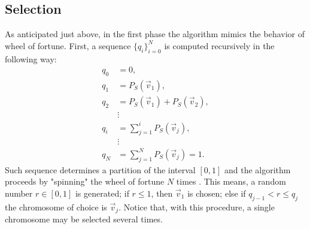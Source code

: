 \documentclass[%
    corpo=11pt,
    twoside,
    stile=classica,
    oldstyle,
    autoretitolo,
    tipotesi=magistrale,
    greek,
    evenboxes,
    english
]{toptesi}
\begin{document}
\subsection{Selection}
As anticipated just above, in the first phase the algorithm mimics the behavior of wheel of fortune. First, a sequence $\{q_i\}_{i=0}^{N}$ is computed recursively in the following way:
\begin{align}
q_0 &= 0, \nonumber \\
q_1 &= P_S(\vec{v}_1), \nonumber \\
q_2 &= P_S(\vec{v}_1) + P_S(\vec{v}_2), \nonumber \\
&\vdots \nonumber \\
q_i &= \sum_{j=1}^{i}P_S(\vec{v}_j), \nonumber \\
&\vdots \nonumber \\
q_N &= \sum_{j=1}^{N}P_S(\vec{v}_j) = 1.
\end{align}
Such sequence determines a partition of the interval $\left[0,1\right]$ and the algorithm proceeds by "spinning" the wheel of fortune $N$ times . This means, a random number $r\in \left[0,1\right]$ is generated; if $r \leq 1$, then $\vec{v}_1$ is chosen; else if $q_{j-1} < r \leq q_j$ the chromosome of choice is $\vec{v}_j$. Notice that, with this procedure, a single chromosome may be selected several times. 
\end{document}
